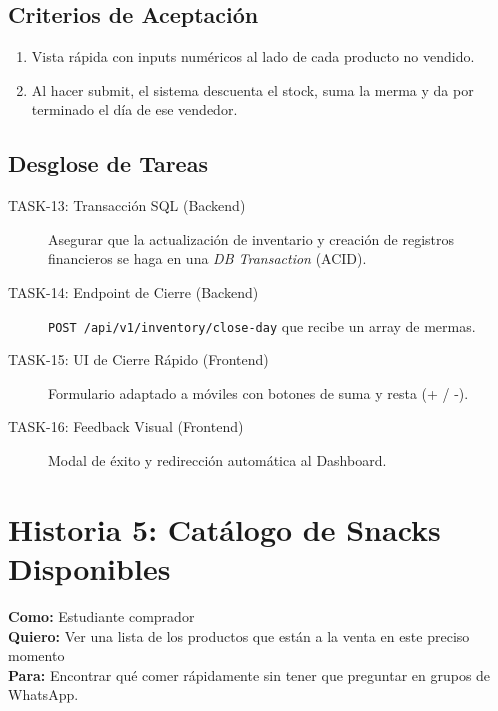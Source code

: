 \documentclass[11pt, letterpaper]{article}
\begin{document}
    \subsection{Criterios de Aceptación}
    \begin{enumerate}[label=\bfseries\arabic*.]
        \item Vista rápida con inputs numéricos al lado de cada producto no vendido.
        \item Al hacer submit, el sistema descuenta el stock, suma la merma y da por terminado el día de ese vendedor.
    \end{enumerate}
   
    \subsection{Desglose de Tareas}
    \begin{description}
        \item[TASK-13: Transacción SQL (Backend)] Asegurar que la actualización de inventario y creación de registros financieros se haga en una \textit{DB Transaction} (ACID).
        \item[TASK-14: Endpoint de Cierre (Backend)] \texttt{POST /api/v1/inventory/close-day} que recibe un array de mermas.
        \item[TASK-15: UI de Cierre Rápido (Frontend)] Formulario adaptado a móviles con botones de suma y resta (+ / -).
        \item[TASK-16: Feedback Visual (Frontend)] Modal de éxito y redirección automática al Dashboard.
    \end{description}

    \newpage

    \section{Historia 5: Catálogo de Snacks Disponibles}
   
    \begin{tcolorbox}[colback=orange!5!white,colframe=orange!75!black,title=HU-05: Búsqueda en Tiempo Real]
        \textbf{Como:} Estudiante comprador \\
        \textbf{Quiero:} Ver una lista de los productos que están a la venta en este preciso momento \\
        \textbf{Para:} Encontrar qué comer rápidamente sin tener que preguntar en grupos de WhatsApp.
    \end{tcolorbox}
   
\end{document}
